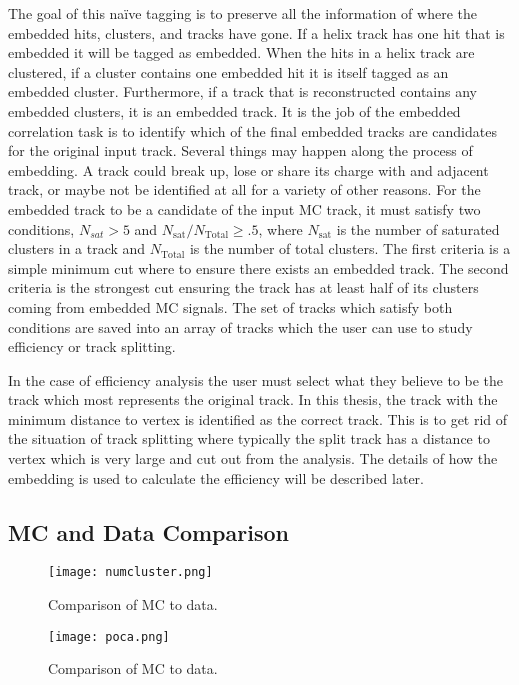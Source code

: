 The goal of this na\"ive tagging is to preserve all the information of where the embedded hits, clusters, and tracks have gone. If a helix track has one hit that is embedded it will be tagged as embedded. When the hits in a helix track are clustered, if a cluster contains one embedded hit it is itself tagged as an embedded cluster. Furthermore, if a track that is reconstructed contains any embedded clusters, it is an embedded track.  It is the job of the embedded correlation task is to identify which of the final embedded tracks are candidates for the original input track. Several things may happen along the process of embedding. A track could break up, lose or share its charge with and adjacent track, or maybe not be identified at all for a variety of other reasons. For the embedded track to be a candidate of the input MC track, it must satisfy two conditions, $N_{sat} > 5$ and $N_{\mathrm{sat}}/N_{\mathrm{Total}} \geq .5$, where $N_{\mathrm{sat}}$ is the number of saturated clusters in a track and $N_{\mathrm{Total}}$ is the number of total clusters. The first criteria is a simple minimum cut where to ensure there exists an embedded track. The second criteria is the strongest cut ensuring the track has at least half of its clusters coming from embedded MC signals. The set of tracks which satisfy both conditions are saved into an array of tracks which the user can use to study efficiency or track splitting. 

In the case of efficiency analysis the user must select what they believe to be the track which most represents the original track. In this thesis, the track with the minimum distance to vertex is identified as the correct track. This is to get rid of the situation of track splitting where typically the split track has a distance to vertex which is very large and cut out from the analysis. The details of how the embedding is used to calculate the efficiency will be described later. 



\subsection{MC and Data Comparison}

\begin{figure}[!hbt]
\texttt{[image: numcluster.png]}
\caption{Comparison of MC to data.}
\label{fig:clustcomp}
\end{figure}


\begin{figure}[!hbt]
\texttt{[image: poca.png]}
\caption{Comparison of MC to data.}
\label{fig:pocacomp}
\end{figure}


